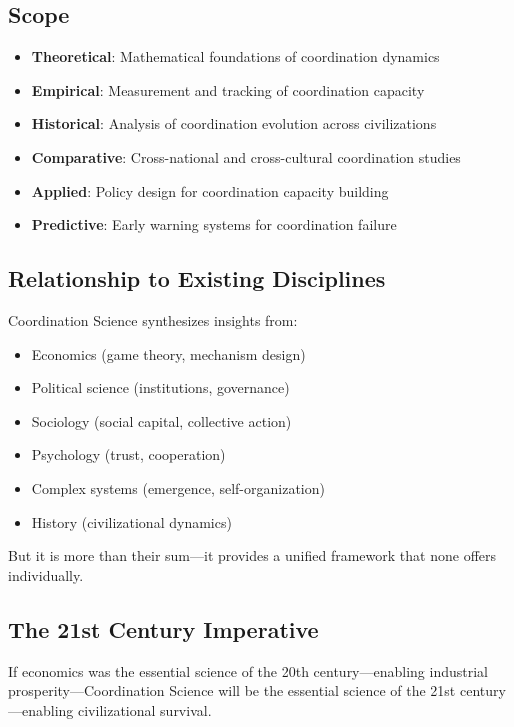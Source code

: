 \documentclass[12pt,letterpaper]{article}
\begin{document}
\subsection{Scope}

\begin{itemize}
    \item \textbf{Theoretical}: Mathematical foundations of coordination dynamics
    \item \textbf{Empirical}: Measurement and tracking of coordination capacity
    \item \textbf{Historical}: Analysis of coordination evolution across civilizations
    \item \textbf{Comparative}: Cross-national and cross-cultural coordination studies
    \item \textbf{Applied}: Policy design for coordination capacity building
    \item \textbf{Predictive}: Early warning systems for coordination failure
\end{itemize}

\subsection{Relationship to Existing Disciplines}

Coordination Science synthesizes insights from:
\begin{itemize}
    \item Economics (game theory, mechanism design)
    \item Political science (institutions, governance)
    \item Sociology (social capital, collective action)
    \item Psychology (trust, cooperation)
    \item Complex systems (emergence, self-organization)
    \item History (civilizational dynamics)
\end{itemize}

But it is more than their sum---it provides a unified framework that none offers individually.

\subsection{The 21st Century Imperative}

If economics was the essential science of the 20th century---enabling industrial prosperity---Coordination Science will be the essential science of the 21st century---enabling civilizational survival.
\end{document}
